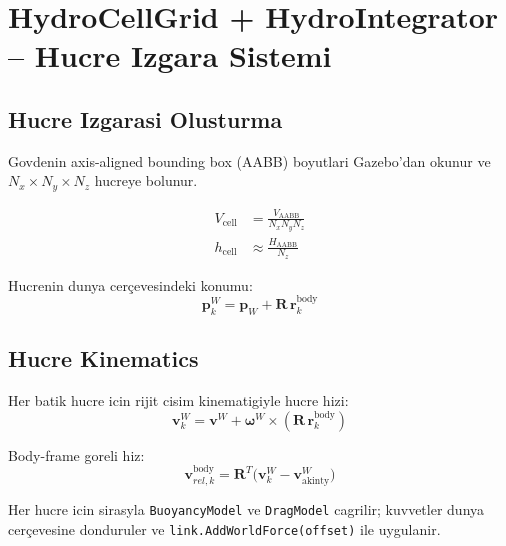 \documentclass[12pt,a4paper]{article}
\begin{document}
\section{HydroCellGrid + HydroIntegrator -- Hucre Izgara Sistemi}

\subsection{Hucre Izgarasi Olusturma}

Govdenin axis-aligned bounding box (AABB) boyutlari Gazebo'dan okunur ve
$N_x \times N_y \times N_z$ hucreye bolunur.

\begin{align}
  V_{\text{cell}} &= \frac{V_{\text{AABB}}}{N_x N_y N_z}
  \label{eq:cell_vol} \\[4pt]
  h_{\text{cell}} &\approx \frac{H_{\text{AABB}}}{N_z}
  \label{eq:cell_h}
\end{align}

Hucrenin dunya cerçevesindeki konumu:
\begin{equation}
  \mathbf{p}_{k}^W = \mathbf{p}_W + \mathbf{R}\,\mathbf{r}_{k}^{\text{body}}
  \label{eq:cell_pos}
\end{equation}

\subsection{Hucre Kinematics}

Her batik hucre icin rijit cisim kinematigiyle hucre hizi:
\begin{equation}
  \mathbf{v}_{k}^W = \mathbf{v}^W + \boldsymbol{\omega}^W \times
  (\mathbf{R}\,\mathbf{r}_{k}^{\text{body}})
  \label{eq:cell_vel}
\end{equation}

Body-frame goreli hiz:
\begin{equation}
  \mathbf{v}_{rel,k}^{\text{body}}
    = \mathbf{R}^T\!\bigl(\mathbf{v}_{k}^W - \mathbf{v}_{\text{akinty}}^W\bigr)
  \label{eq:cell_rel_vel}
\end{equation}

Her hucre icin sirasyla \texttt{BuoyancyModel} ve \texttt{DragModel}
cagrilir; kuvvetler dunya cerçevesine donduruler ve
\texttt{link.AddWorldForce(offset)} ile uygulanir.

\end{document}
